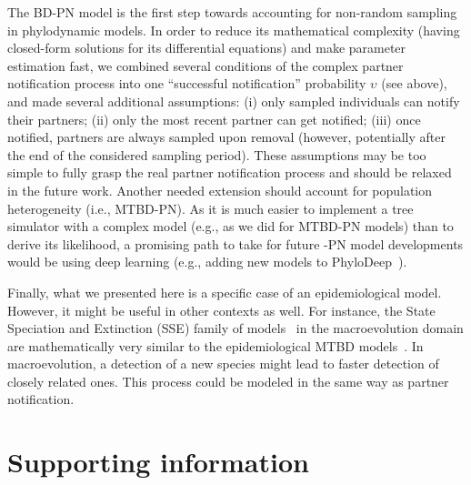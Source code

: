 \documentclass[10pt,letterpaper]{article}
\begin{document}
\bigskip 

The BD-PN model is the first step towards accounting for non-random sampling in phylodynamic models. In order to reduce its mathematical complexity (having closed-form solutions for its differential equations) and make parameter estimation fast, we combined several conditions of the complex partner notification process into one ``successful notification'' probability $\upsilon$ (see above), and made several additional assumptions: (i) only sampled individuals can notify their partners; (ii) only the most recent partner can get notified; (iii) once notified, partners are always sampled upon removal (however, potentially after the end of the considered sampling period). These assumptions may be too simple to fully grasp the real partner notification process and should be relaxed in the future work. Another needed extension should account for population heterogeneity (i.e., MTBD-PN). As it is much easier to implement a tree simulator with a complex model (e.g., as we did for MTBD-PN models) than to derive its likelihood, a promising path to take for future -PN model developments would be using deep learning (e.g., adding new models to PhyloDeep~\cite{Voznica2021}). 

Finally, what we presented here is a specific case of an epidemiological model. However, it might be useful in other contexts as well.
For instance, the State Speciation and Extinction (SSE) family of models~\cite{Maddison2007,fitzjohnEstimatingTraitDependentSpeciation2009,goldbergTempoModePlant2012} in the macroevolution domain are mathematically very similar to the epidemiological MTBD models~\cite{macphersonUnifyingPhylogeneticBirth2022}. In macroevolution, a detection of a new species might lead to faster detection of closely related ones. This process could be modeled in the same way as partner notification. 


\section*{Supporting information}
\end{document}
